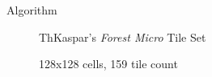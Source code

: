 \documentclass{beamer}
\begin{document}
%

  \begin{frame}[fragile]{Algorithm}

    \begin{figure}

      ThKaspar's \textit{Forest Micro} Tile Set

      128x128 cells, 159 tile count
    \end{figure}
  \end{frame}

%

%
%
%
\end{document}
